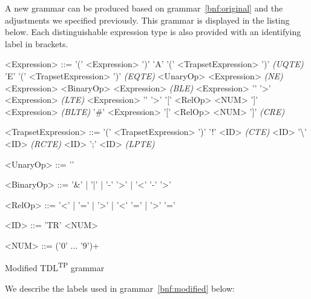 \documentclass[12pt,oneside,a4paper,notitlepage]{report}
\newcommand{\texttilde}{\raisebox{0.5ex}{\texttildelow}}
\begin{document}
	\newpage

	\par A new grammar can be produced based on grammar~\ref{bnf:original} and the adjustments we specified previously. This grammar is displayed in the listing below. Each distinguishable expression type is also provided with an identifying label in brackets.
		
	\begin{GrammarWrapper}
		\begin{grammar}
			<Expression>	::=	'(' <Expression> ')'
			\alt 				'A' '(' <TrapsetExpression> ')' \textit{(UQTE)}
			\alt 				'E' '(' <TrapsetExpression> ')' \textit{(EQTE)}
			\alt 				<UnaryOp> <Expression> \textit{(NE)}
			\alt 				<Expression> <BinaryOp> <Expression> \textit{(BLE)}
			\alt 				<Expression> '\texttilde' '\textgreater' <Expression> \textit{(LTE)}
			\alt 				<Expression> '\texttilde' '\textgreater' '[' <RelOp> <NUM> ']' <Expression> \textit{(BLTE)}
			\alt 				'\#' <Expression> '[' <RelOp> <NUM> ']' \textit{(CRE)}
	
			<TrapsetExpression>	::=	'(' <TrapsetExpression> ')'
			\alt						'!' <ID> \textit{(CTE)}
			\alt 						<ID> '\textbackslash' <ID> \textit{(RCTE)}
			\alt						<ID> ';' <ID> \textit{(LPTE)}
	
			<UnaryOp>	::= '\texttilde'
	
			<BinaryOp>	::= '\&' | '|' | '-' '\textgreater' | '\textless' '-' '\textgreater'
	
			<RelOp> 	::= '\textless' | '=' | '\textgreater' | '\textless' '=' | '\textgreater' '='
	
			<ID> 		::= 'TR' <NUM>
	
			<NUM> 		::= ('0' ... '9')+
		\end{grammar}
		\caption{Modified TDL\textsuperscript{TP} grammar}\label{bnf:modified}
	\end{GrammarWrapper}

	\newpage

	\par We describe the labels used in grammar~\ref{bnf:modified} below: %
\end{document}
